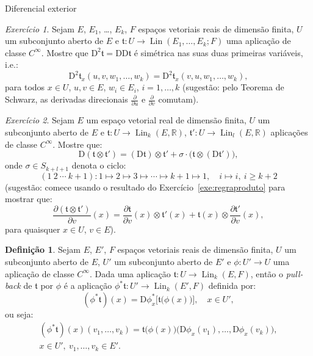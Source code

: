 \documentclass[oneside,11pt]{amsart}
\newcommand{\R}{\mathds R}
\newcommand{\Dd}{\mathrm D}
\DeclareMathOperator{\Lin}{Lin}
\theoremstyle{remark}\newtheorem{exercise}{Exercício}[section]
\theoremstyle{plain}\newtheorem{teo}{Teorema}[section]
\theoremstyle{plain}\newtheorem{lem}[teo]{Lema}
\theoremstyle{plain}\newtheorem{prop}[teo]{Proposição}
\theoremstyle{definition}\newtheorem{defin}[teo]{Definição}
\theoremstyle{remark}\newtheorem{rem}[teo]{Observação}
\theoremstyle{definition}\newtheorem{example}[teo]{Exemplo}
\numberwithin{equation}{section}
\begin{document}
\begin{section}{Diferencial exterior}
\begin{exercise}\label{exe:Schwarz}
Sejam $E$, $E_1$, \dots, $E_k$, $F$ espaços vetoriais reais de dimensão finita, $U$ um subconjunto aberto de $E$ e
$\mathfrak t:U\to\Lin(E_1,\ldots,E_k;F)$ uma aplicação de classe $C^\infty$. Mostre que $\Dd^2\mathfrak t=\Dd\Dd\mathfrak t$ é simétrica nas suas duas primeiras
variáveis, i.e.:
\[\Dd^2\mathfrak t_x(u,v,w_1,\ldots,w_k)=\Dd^2\mathfrak t_x(v,u,w_1,\ldots,w_k),\]
para todos $x\in U$, $u,v\in E$, $w_i\in E_i$, $i=1,\ldots,k$ (sugestão: pelo Teorema de Schwarz, as derivadas direcionais $\frac{\partial}{\partial u}$
e $\frac{\partial}{\partial v}$ comutam).
\end{exercise}

\begin{exercise}\label{exe:Dotimes}
Sejam $E$ um espaço vetorial real de dimensão finita, $U$ um subconjunto aberto de $E$ e $\mathfrak t:U\to\Lin_k(E,\R)$,
$\mathfrak t':U\to\Lin_l(E,\R)$ aplicações de classe $C^\infty$. Mostre que:
\[\Dd(\mathfrak t\otimes\mathfrak t')=(\Dd\mathfrak t)\otimes\mathfrak t'+\sigma\cdot\big(\mathfrak t\otimes(\Dd\mathfrak t')\big),\]
onde $\sigma\in S_{k+l+1}$ denota o ciclo:
\[(1\ 2\ \cdots\ k+1):1\mapsto2\mapsto3\mapsto\cdots\mapsto k+1\mapsto1,\quad i\mapsto i,\ i\ge k+2\]
(sugestão: comece usando o resultado do Exercício~\ref{exe:regraproduto} para mostrar que:
\[\frac{\partial(\mathfrak t\otimes\mathfrak t')}{\partial v}(x)=\frac{\partial\mathfrak t}{\partial v}(x)\otimes\mathfrak t'(x)+
\mathfrak t(x)\otimes\frac{\partial\mathfrak t'}{\partial v}(x),\]
para quaisquer $x\in U$, $v\in E$).
\end{exercise}

\begin{defin}
Sejam $E$, $E'$, $F$ espaços vetoriais reais de dimensão finita, $U$ um subconjunto aberto de $E$, $U'$ um subconjunto aberto de $E'$ e $\phi:U'\to U$
uma aplicação de classe $C^\infty$. Dada uma aplicação $\mathfrak t:U\to\Lin_k(E,F)$, então o {\em pull-back\/} de $\mathfrak t$ por $\phi$ é a aplicação
$\phi^*\mathfrak t:U'\to\Lin_k(E',F)$ definida por:
\[(\phi^*\mathfrak t)(x)=\Dd\phi_x^*\big[\mathfrak t\big(\phi(x)\big)\big],\quad x\in U',\]
ou seja:
\begin{multline*}
(\phi^*\mathfrak t)(x)(v_1,\ldots,v_k)=\mathfrak t\big(\phi(x)\big)\big(\Dd\phi_x(v_1),\ldots,\Dd\phi_x(v_k)\big),\\
x\in U',\ v_1,\ldots,v_k\in E'.
\end{multline*}
\end{defin}


\end{section}
\end{document}
